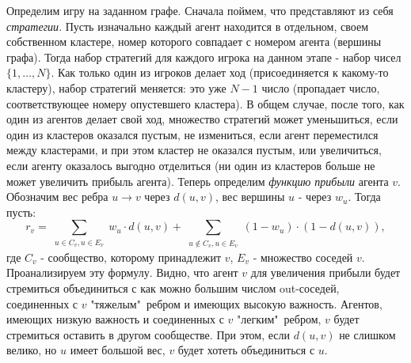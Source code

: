 Определим игру на заданном графе. Сначала поймем, что представляют из себя \textit{стратегии}. Пусть изначально каждый агент находится в отдельном, своем собственном кластере, номер которого совпадает с номером агента (вершины графа). Тогда набор стратегий для каждого игрока на данном этапе - набор чисел $\{1,\dots,N\}$. Как только один из игроков делает ход (присоединяется к какому-то кластеру), набор стратегий меняется: это уже $N-1$ число (пропадает число, соответствующее номеру опустевшего кластера). В общем случае, после того, как один из агентов делает свой ход, множество стратегий может уменьшиться, если один из кластеров оказался пустым, не измениться, если агент переместился между кластерами, и при этом кластер не оказался пустым, или увеличиться, если агенту оказалось выгодно отделиться (ни один из кластеров больше не может увеличить прибыль агента). Теперь определим \textit{функцию прибыли} агента $v$. Обозначим вес ребра $u\rightarrow v$ через $d(u, v)$, вес вершины $u$ - через $w_u$. Тогда пусть:
\begin{equation}
r_v = \sum_{\substack{u\in{C_v}, u\in{E_v}}} w_u\cdot d(u, v) + \sum_{\substack{u\notin{C_v}, u\in{E_v}}} (1-w_u)\cdot(1-d(u, v)),
\end{equation}
где $C_v$ - сообщество, которому принадлежит $v$, $E_v$ - множество соседей $v$. Проанализируем эту формулу. Видно, что агент $v$ для увеличения прибыли будет стремиться объединиться с как можно большим числом out-соседей, соединенных с $v$ "тяжелым"\ ребром и имеющих высокую важность. Агентов, имеющих низкую важность и соединенных с $v$ "легким"\ ребром, $v$ будет стремиться оставить в другом сообществе. При этом, если $d(u, v)$ не слишком велико, но $u$ имеет большой вес, $v$ будет хотеть объединиться с $u$.  \\


